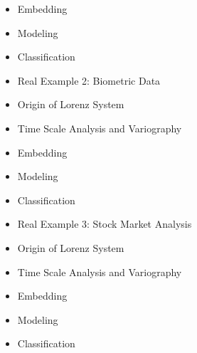 \begin{itemize}
\item Embedding
\item Modeling
\item Classification
\item Real Example 2: Biometric Data
\item Origin of Lorenz System
\item Time Scale Analysis and Variography
\item Embedding
\item Modeling
\item Classification
\item Real Example 3: Stock Market Analysis
\item Origin of Lorenz System
\item Time Scale Analysis and Variography
\item Embedding
\item Modeling
\item Classification
\end{itemize}
